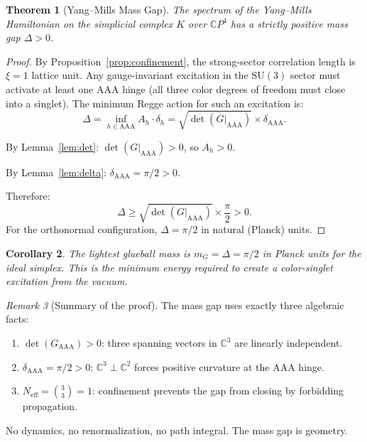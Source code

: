 \documentclass[12pt]{article}
\newtheorem{theorem}{Theorem}[section]
\newtheorem{corollary}[theorem]{Corollary}
\theoremstyle{remark}
\newtheorem{remark}[theorem]{Remark}
\begin{document}
\begin{theorem}[Yang--Mills Mass Gap]
\label{thm:massgap}
The spectrum of the Yang--Mills Hamiltonian on the simplicial complex $K$
over $\mathbb{C}P^4$ has a strictly positive mass gap $\Delta > 0$.
\end{theorem}

\begin{proof}
By Proposition~\ref{prop:confinement}, the strong-sector correlation
length is $\xi = 1$ lattice unit. Any gauge-invariant excitation in
the $\mathrm{SU}(3)$ sector must activate at least one AAA hinge
(all three color degrees of freedom must close into a singlet).
The minimum Regge action for such an excitation is:
\begin{equation}
\Delta = \inf_{h \in \mathrm{AAA}} A_h \cdot \delta_h
= \sqrt{\det(G|_{\mathrm{AAA}})} \times \delta_{\mathrm{AAA}}.
\end{equation}

By Lemma~\ref{lem:det}: $\det(G|_{\mathrm{AAA}}) > 0$,
so $A_h > 0$.

By Lemma~\ref{lem:delta}: $\delta_{\mathrm{AAA}} = \pi/2 > 0$.

Therefore:
\begin{equation}
\boxed{\Delta \geq \sqrt{\det(G|_{\mathrm{AAA}})} \times
\frac{\pi}{2} > 0.}
\end{equation}
For the orthonormal configuration, $\Delta = \pi/2$ in natural
(Planck) units.
\end{proof}

\begin{corollary}
The lightest glueball mass is $m_G = \Delta = \pi/2$ in Planck units
for the ideal simplex. This is the minimum energy required to create
a color-singlet excitation from the vacuum.
\end{corollary}

\begin{remark}[Summary of the proof]
The mass gap uses exactly three algebraic facts:
\begin{enumerate}
\item[(i)] $\det(G_{\mathrm{AAA}}) > 0$: three spanning vectors in
  $\mathbb{C}^3$ are linearly independent.
\item[(ii)] $\delta_{\mathrm{AAA}} = \pi/2 > 0$:
  $\mathbb{C}^3 \perp \mathbb{C}^2$ forces positive curvature at the
  AAA hinge.
\item[(iii)] $N_{\mathrm{eff}} = \binom{3}{3} = 1$: confinement
  prevents the gap from closing by forbidding propagation.
\end{enumerate}
No dynamics, no renormalization, no path integral. The mass gap is
geometry.
\end{remark}
\end{document}
